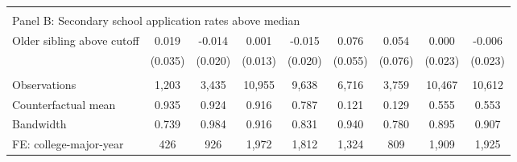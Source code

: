 {{\begin{tabular}{lcccccccc}
&  &  &  & & & & & &    \\
\multicolumn{9}{l}{Panel B: Secondary school application rates above median} \\
Older sibling above cutoff&       0.019   &      -0.014   &       0.001   &      -0.015   &       0.076   &       0.054   &       0.000   &      -0.006   \\
                    &     (0.035)   &     (0.020)   &     (0.013)   &     (0.020)   &     (0.055)   &     (0.076)   &     (0.023)   &     (0.023)   \\
                    &               &               &               &               &               &               &               &               \\
Observations        &       1,203   &       3,435   &      10,955   &       9,638   &       6,716   &       3,759   &      10,467   &      10,612   \\
Counterfactual mean &       0.935   &       0.924   &       0.916   &       0.787   &       0.121   &       0.129   &       0.555   &       0.553   \\
Bandwidth           &       0.739   &       0.984   &       0.916   &       0.831   &       0.940   &       0.780   &       0.895   &       0.907   \\
FE: college-major-year&         426   &         926   &       1,972   &       1,812   &       1,324   &         809   &       1,909   &       1,925   \\
 

\bottomrule
\end{tabular}
}
}
